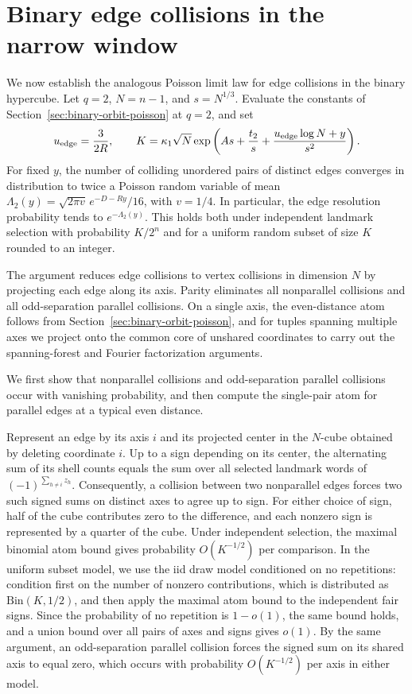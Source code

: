 \section{Binary edge collisions in the narrow window}
\label{sec:binary-edge-poisson}

We now establish the analogous Poisson limit law for edge collisions in the binary hypercube. Let \(q=2\), \(N=n-1\), and \(s=N^{1/3}\). Evaluate the constants of Section~\ref{sec:binary-orbit-poisson} at \(q=2\), and set
\[
 u_{\rm edge}=\frac{3}{2R},\qquad
 K=\kappa_1\sqrt N\exp\left(As+\frac{t_2}{s}
                    +\frac{u_{\rm edge}\log N+y}{s^2}\right).
\]
For fixed \(y\), the number of colliding unordered pairs of distinct edges converges in distribution to twice a Poisson random variable of mean \(\Lambda_2(y)=\sqrt{2\pi v}\,e^{-D-Ry}/16\), with \(v=1/4\). In particular, the edge resolution probability tends to \(e^{-\Lambda_2(y)}\). This holds both under independent landmark selection with probability \(K/2^n\) and for a uniform random subset of size \(K\) rounded to an integer.

The argument reduces edge collisions to vertex collisions in dimension \(N\) by projecting each edge along its axis. Parity eliminates all nonparallel collisions and all odd-separation parallel collisions. On a single axis, the even-distance atom follows from Section~\ref{sec:binary-orbit-poisson}, and for tuples spanning multiple axes we project onto the common core of unshared coordinates to carry out the spanning-forest and Fourier factorization arguments.

We first show that nonparallel collisions and odd-separation parallel collisions occur with vanishing probability, and then compute the single-pair atom for parallel edges at a typical even distance.

Represent an edge by its axis \(i\) and its projected center in the \(N\)-cube obtained by deleting coordinate \(i\). Up to a sign depending on its center, the alternating sum of its shell counts equals the sum over all selected landmark words of \((-1)^{\sum_{h\ne i}z_h}\). Consequently, a collision between two nonparallel edges forces two such signed sums on distinct axes to agree up to sign. For either choice of sign, half of the cube contributes zero to the difference, and each nonzero sign is represented by a quarter of the cube. Under independent selection, the maximal binomial atom bound gives probability \(O(K^{-1/2})\) per comparison. In the uniform subset model, we use the iid draw model conditioned on no repetitions: condition first on the number of nonzero contributions, which is distributed as \(\mathrm{Bin}(K,1/2)\), and then apply the maximal atom bound to the independent fair signs. Since the probability of no repetition is \(1-o(1)\), the same bound holds, and a union bound over all pairs of axes and signs gives \(o(1)\). By the same argument, an odd-separation parallel collision forces the signed sum on its shared axis to equal zero, which occurs with probability \(O(K^{-1/2})\) per axis in either model.

